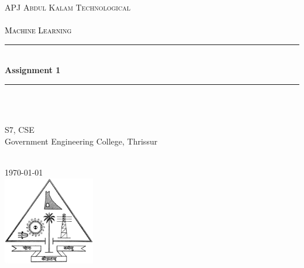 \begin{titlepage}
    \newcommand{\HRule}{\rule{\linewidth}{0.5mm}}
    
    
    \center
        \textsc{\LARGE APJ Abdul Kalam Technological \\[0.3cm]}\\[1cm] 
        \textsc{\Large \textcolor{black}{Machine Learning}}\\[0.2cm]
        
        \HRule \\[0.4cm]
        { \huge \bfseries \textcolor{DeepMagenta}{Assignment 1}}\\[0.4cm]
        \HRule \\[1.5cm]
     
        \begin{minipage}{0.4\textwidth}
        \begin{center} \large
        \emph{ }\\
            S7, CSE \\
            Government Engineering College, Thrissur
        \end{center}
        \end{minipage} \\[2cm]
        
        {\large \today}\\[2cm] 
    
        \includegraphics[width=40mm,scale=0.5]{KTU_Logo.png}
    \vfill 
\end{titlepage}